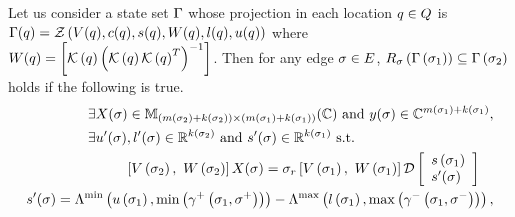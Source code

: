 \begin{lemma}
  Let us consider a state set $\Gamma$ whose projection in each location
  $q\in Q$ is $\Gamma(q) =
  \mathcal{Z}\left(V(q),c(q),s(q),W(q),l(q),u(q)\right)$ where
  $W(q)={\left[\mathcal{K}\left(q\right)\left(\mathcal{K}\left(q\right)\mathcal{K}\left(q\right)^T\right)^{-1}\right]}$.  Then for any edge
  $\sigma\in E$, $R_{\sigma}\left(\Gamma\left(\sigma_{1}\right)\right) \subseteq
  \Gamma\left(\sigma_{2}\right)$
    holds if the following is true.
\begin{align}
\begin{split}
& \exists X(\sigma)\in
\mathbb{M}_{\left(m\left(\sigma_{2}\right)+k\left(\sigma_{2}\right)\right)\times \left(m\left(\sigma_{1}\right)+k\left(\sigma_{1}\right)\right)}(\mathbb{\mathbb{C}})~\text{and}~y(\sigma)\in
\mathbb{C}^{m\left(\sigma_{1}\right)+k\left(\sigma_{1}\right)},\\
& \exists u^\prime(\sigma),l^\prime(\sigma)\in \mathbb{R}^{k\left(\sigma_{2}\right)}~\text{and}~s^\prime(\sigma)\in\mathbb{R}^{k\left(\sigma_{1}\right)}~\text{s.t.}\\
\end{split}\\
\begin{split}
& \left[V\left(\sigma_{2}\right),~W\left(\sigma_{2}\right)\right]X(\sigma) = \sigma_r\left[V\left(\sigma_{1}\right),~W\left(\sigma_{1}\right)\right]\mathcal{D}
\left[\begin{array}{l}{s\left(\sigma_{1}\right)}\\{s^\prime(\sigma)} \end{array}\right]
\end{split}\\
\begin{split}
s^\prime(\sigma) = \Lambda^{\min}\left(u\left(\sigma_{1}\right),\min\left(\gamma^+\left(\sigma_{1},\sigma^+\right)\right)\right)-
\Lambda^{\max}\left(l\left(\sigma_{1}\right),\max\left(\gamma^-\left(\sigma_{1},\sigma^-\right)\right)\right),\\
\end{split}\\
\end{align}
\end{lemma}